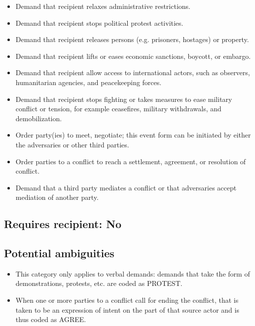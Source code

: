 \documentclass[11pt]{report}
\newcommand{\plcat}[1]{\textsf{#1}}
\begin{document}
\begin{itemize}
\item Demand that recipient relaxes administrative restrictions.
\item Demand that recipient stops political protest activities.
\item Demand that recipient releases persons (e.g. prisoners, hostages) or property.
\item Demand that recipient lifts or eases economic sanctions, boycott, or embargo.
\item Demand that recipient allow access to international actors, such as observers, humanitarian agencies, and peacekeeping forces.
\item Demand that recipient stops fighting or takes measures to ease military conflict or tension, for example ceasefires, military withdrawals, and demobilization.
\item Order party(ies) to meet, negotiate; this event form can be initiated by either the adversaries or other third parties.
\item Order parties to a conflict to reach a settlement, agreement, or resolution of conflict. 
\item Demand that a third party mediates a conflict or that adversaries accept mediation of another party.
\end{itemize}


\subsection{Requires recipient: No}


\subsection{Potential ambiguities}

\begin{itemize}
\item This category only applies to verbal demands: demands that take the form of demonstrations, protests, etc. are coded as \plcat{PROTEST}.
\item When one or more parties to a conflict call for ending the conflict, that is taken to be an expression of intent on the part of that source actor and is thus coded as \plcat{AGREE}.

\end{itemize}

\end{document}
